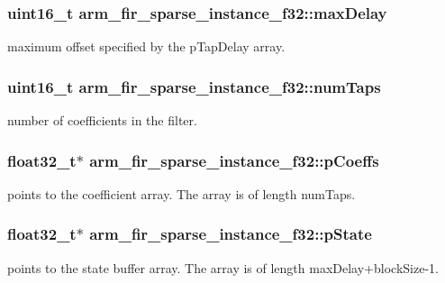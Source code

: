 \subsubsection[{\texorpdfstring{max\+Delay}{maxDelay}}]{\setlength{\rightskip}{0pt plus 5cm}uint16\+\_\+t arm\+\_\+fir\+\_\+sparse\+\_\+instance\+\_\+f32\+::max\+Delay}\hypertarget{structarm__fir__sparse__instance__f32_af8b8c775f4084c36774f06c082b4c078}{}\label{structarm__fir__sparse__instance__f32_af8b8c775f4084c36774f06c082b4c078}
maximum offset specified by the p\+Tap\+Delay array. 
\subsubsection[{\texorpdfstring{num\+Taps}{numTaps}}]{\setlength{\rightskip}{0pt plus 5cm}uint16\+\_\+t arm\+\_\+fir\+\_\+sparse\+\_\+instance\+\_\+f32\+::num\+Taps}\hypertarget{structarm__fir__sparse__instance__f32_a5e19e7f234ac30a3db843352bf2a8515}{}\label{structarm__fir__sparse__instance__f32_a5e19e7f234ac30a3db843352bf2a8515}
number of coefficients in the filter. 
\subsubsection[{\texorpdfstring{p\+Coeffs}{pCoeffs}}]{\setlength{\rightskip}{0pt plus 5cm}float32\+\_\+t$\ast$ arm\+\_\+fir\+\_\+sparse\+\_\+instance\+\_\+f32\+::p\+Coeffs}\hypertarget{structarm__fir__sparse__instance__f32_a04af7c738dfb0882ad102fcad501d94a}{}\label{structarm__fir__sparse__instance__f32_a04af7c738dfb0882ad102fcad501d94a}
points to the coefficient array. The array is of length num\+Taps. 
\subsubsection[{\texorpdfstring{p\+State}{pState}}]{\setlength{\rightskip}{0pt plus 5cm}float32\+\_\+t$\ast$ arm\+\_\+fir\+\_\+sparse\+\_\+instance\+\_\+f32\+::p\+State}\hypertarget{structarm__fir__sparse__instance__f32_a794af0916666d11cc564d6df08553555}{}\label{structarm__fir__sparse__instance__f32_a794af0916666d11cc564d6df08553555}
points to the state buffer array. The array is of length max\+Delay+block\+Size-\/1. 
